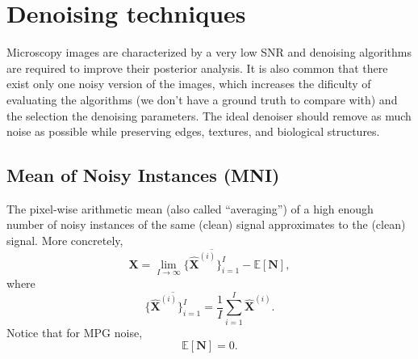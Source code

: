 \documentclass{article}
\begin{document}


\section{Denoising techniques}


Microscopy images are characterized by a very low SNR and denoising
algorithms are required to improve their posterior analysis. It is
also common that there exist only one noisy version of the images,
which increases the dificulty of evaluating the algorithms (we don't
have a ground truth to compare with) and the selection the denoising
parameters. The ideal denoiser should remove as much noise as
possible while preserving edges, textures, and biological structures.

\subsection{Mean of Noisy Instances (MNI)}

The pixel-wise arithmetic mean (also called ``averaging'') of a
high enough number of noisy instances of the same (clean) signal
approximates to the (clean) signal. More concretely,
\begin{equation}
  {\mathbf X} = \lim_{I \to \infty} \overline{\{\hat{\mathbf X}^{(i)}\}_{i=1}^I}  - \mathbb{E}\left[\mathbf{N}\right],
  \label{eq:mean_with_bias}
\end{equation}
where
\begin{equation}
  \overline{\{\hat{\mathbf X}^{(i)}\}_{i=1}^I} = \frac{1}{I} \sum_{i=1}^I \hat{\mathbf X}^{(i)}.
  \label{eq:mean}
\end{equation}
Notice that for MPG noise,
\begin{equation}
  \mathbb{E}\left[\mathbf{N}\right] = 0.
\end{equation}
\end{document}
